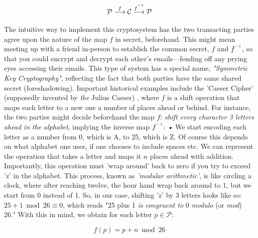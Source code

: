 \documentclass[11pt,a4paper]{article}
\newcommand{\inv}{^{\raisebox{.2em}{$\scriptscriptstyle-1$}}}
\begin{document}
$$ \mathcal{P} \overset{f}\longrightarrow \mathcal{C} \overset{f\inv}\longrightarrow \mathcal{P} $$

The intuitive way to implement this cryptosystem has the two transacting parties agree upon the nature of the map $f$ in secret, beforehand. This might mean meeting up with a friend in-person to establish the common secret, $f$ and $f\inv$, so that you could encrypt and decrypt each other's emails—fending off any prying eyes accessing their emails. This type of system has a special name, \textit{"Symmetric Key Cryptography"}, reflecting the fact that both parties have the same shared secret (foreshadowing). Important historical examples include the 'Caeser Cipher' (supposedly invented by \textit{the} Julius Caeser)%
, where $f$ is a shift operation that maps each letter to a new one a number of places ahead or behind. For instance, the two parties might decide beforehand the map $f$: \textit{shift every character 3 letters ahead in the alphabet}, implying the inverse map $f\inv$: \textit{•} We start encoding each letter as a number from 0, which is A, to 25, which is Z. Of course this depends on what alphabet one uses, if one chooses to include spaces etc. We can represent the operation that takes a letter and maps it $n$ places ahead with addition. Importantly, this operation must 'wrap around' back to zero if you try to exceed 'z' in the alphabet. This process, known as \textit{'modular arithmetic'}, is like circling a clock, where after reaching twelve, the hour hand wrap back around to 1, but we start from 0 instead of 1. So, in our case, shifting 'z' by 3 letters looks like so: $25 + 1 \bmod 26 \equiv 0$, which reads "25 plus 1 \textit{is congruent to} 0 \textit{modulo} (or \textit{mod}) 26." With this in mind, we obtain for each letter $p \in \mathcal{P}$:

\[
f(p) = p + n \bmod 26
\]

\end{document}
